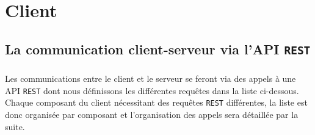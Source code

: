 \chapter{Client}

\section{La communication client-serveur via l'API \texttt{REST}}

\paragraph{}
Les communications entre le client et le serveur se feront via des appels à une API \texttt{REST} dont nous définissons les différentes requêtes dans la liste ci-dessous. Chaque composant du client nécessitant des requêtes \texttt{REST} différentes, la liste est donc organisée par composant et l'organisation des appels sera détaillée par la suite.
\newline{}

